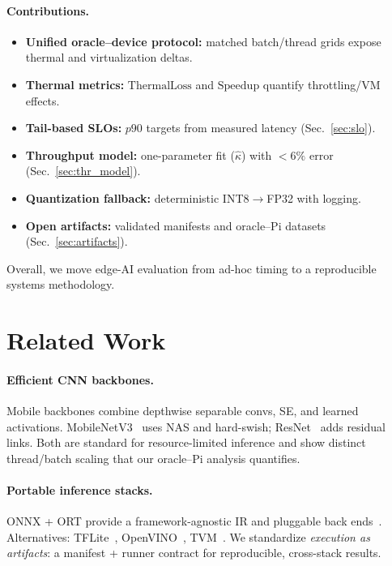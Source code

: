 \documentclass{article}
\begin{document}
\paragraph{Contributions.}
\begin{itemize}
  \item \textbf{Unified oracle–device protocol:} matched batch/thread grids expose thermal and virtualization deltas.
  \item \textbf{Thermal metrics:} $\mathrm{ThermalLoss}$ and $\mathrm{Speedup}$ quantify throttling/VM effects.
  \item \textbf{Tail-based SLOs:} $p90$ targets from measured latency (Sec.~\ref{sec:slo}).
  \item \textbf{Throughput model:} one-parameter fit ($\hat{\kappa}$) with $<6\%$ error (Sec.~\ref{sec:thr_model}).
  \item \textbf{Quantization fallback:} deterministic INT8$\!\rightarrow$FP32 with logging.
  \item \textbf{Open artifacts:} validated manifests and oracle–Pi datasets (Sec.~\ref{sec:artifacts}).
\end{itemize}
Overall, we move edge-AI evaluation from ad-hoc timing to a reproducible systems methodology.

\section{Related Work}

\paragraph{Efficient CNN backbones.}
Mobile backbones combine depthwise separable convs, SE, and learned activations. MobileNetV3~\cite{howard2019mobilenetv3} uses NAS and hard-swish; ResNet~\cite{he2016resnet} adds residual links. Both are standard for resource-limited inference and show distinct thread/batch scaling that our oracle–Pi analysis quantifies.

\paragraph{Portable inference stacks.}
ONNX + ORT provide a framework-agnostic IR and pluggable back ends~\cite{onnxruntime_docs}. Alternatives: TFLite~\cite{tflite_ptq}, OpenVINO~\cite{openvino_overview,openvino_plugin}, TVM~\cite{tvm_osdi18,tvm_arxiv18}. We standardize \emph{execution as artifacts}: a manifest + runner contract for reproducible, cross-stack results.
\end{document}
